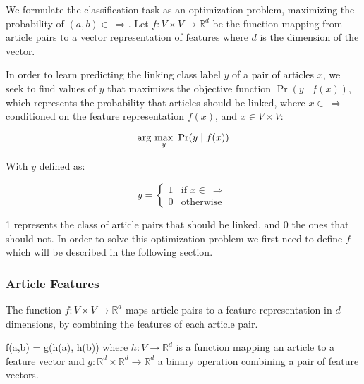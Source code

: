 We formulate the classification task as an optimization problem, maximizing the probability of $(a,b) \in \ \Rightarrow$. Let $f: V\times V \to \mathbb{R}^d$ be the function mapping from article pairs to a vector representation of features where $d$ is the dimension of the vector.

In order to learn predicting the linking class label $y$ of a pair of articles $x$,
we seek to find values of $y$ that maximizes the objective function $\Pr(y \mid f(x))$, which represents the probability that articles should be linked, where $x \in \ \Rightarrow$ conditioned on the feature representation $f(x)$, and $x \in V \times V$:

\begin{equation}
\label{objective}
\arg\ \!\max_y\ \Pr(y \mid f(x))
\end{equation}

With $y$ defined as:

\[
    y=
\begin{cases}
    1 & \text{if } x \in \  \Rightarrow\\
    0 & \text{otherwise}
\end{cases}
\]

1 represents the class of article pairs that should be linked, and 0 the ones that should not.
In order to solve this optimization problem we first need to define $f$ which will be described in the following section.

\subsubsection{Article Features}

The function $f: V\times V \to \mathbb{R}^d$ maps article pairs to a feature representation in $d$ dimensions, by combining the features of each article pair.

f(a,b) = g(h(a), h(b)) where $h: V \to \mathbb{R}^d$ is a function mapping an article to a feature vector and $g: \mathbb{R}^d \times \mathbb{R}^d \to \mathbb{R}^d$ a binary operation combining a pair of feature vectors.

